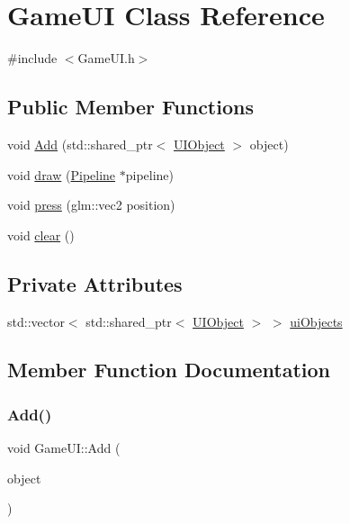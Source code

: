 \hypertarget{class_game_u_i}{}\section{Game\+UI Class Reference}
\label{class_game_u_i}


{\ttfamily \#include $<$Game\+U\+I.\+h$>$}

\subsection*{Public Member Functions}
\begin{DoxyCompactItemize}
\item 
void \hyperlink{class_game_u_i_a48e85aa7bc360b96f5a4f4f6b7abf0f0}{Add} (std\+::shared\+\_\+ptr$<$ \hyperlink{class_u_i_object}{U\+I\+Object} $>$ object)
\item 
void \hyperlink{class_game_u_i_a850141c08b7136a4270055b7d45a8317}{draw} (\hyperlink{class_pipeline}{Pipeline} $\ast$pipeline)
\item 
void \hyperlink{class_game_u_i_a7095c2f36bf6a6529a7cd8e72e8edfe2}{press} (glm\+::vec2 position)
\item 
void \hyperlink{class_game_u_i_aa2faeb231df86a0833f37ca01d1119d8}{clear} ()
\end{DoxyCompactItemize}
\subsection*{Private Attributes}
\begin{DoxyCompactItemize}
\item 
std\+::vector$<$ std\+::shared\+\_\+ptr$<$ \hyperlink{class_u_i_object}{U\+I\+Object} $>$ $>$ \hyperlink{class_game_u_i_abbf214394815b03afd579435f784b7f3}{ui\+Objects}
\end{DoxyCompactItemize}


\subsection{Member Function Documentation}
\mbox{\label{class_game_u_i_a48e85aa7bc360b96f5a4f4f6b7abf0f0}} 
\subsubsection{\texorpdfstring{Add()}{Add()}}
{\footnotesize\ttfamily void Game\+U\+I\+::\+Add (\begin{DoxyParamCaption}\item[{std\+::shared\+\_\+ptr$<$ \hyperlink{class_u_i_object}{U\+I\+Object} $>$}]{object }\end{DoxyParamCaption})}

